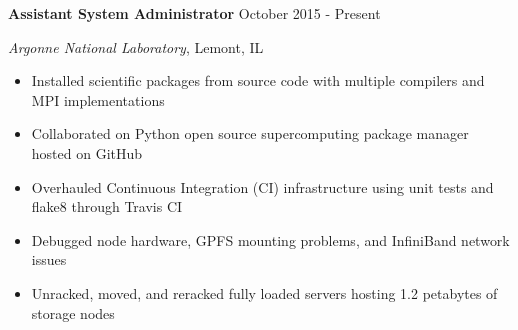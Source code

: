 
\textbf{Assistant System Administrator} \hfill October 2015 - Present

\textit{Argonne National Laboratory}, Lemont, IL

\begin{itemize}
    \item Installed scientific packages from source code with multiple compilers and MPI implementations
    \item Collaborated on Python open source supercomputing package manager hosted on GitHub
    \item Overhauled Continuous Integration (CI) infrastructure using unit tests and flake8 through Travis CI
    \item Debugged node hardware, GPFS mounting problems, and InfiniBand network issues
    \item Unracked, moved, and reracked fully loaded servers hosting 1.2 petabytes of storage nodes
\end{itemize}
